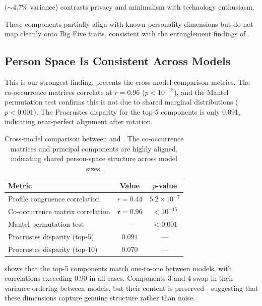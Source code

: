  ($\sim$4.7\% variance) contrasts privacy and minimalism with technology enthusiasm.

These components partially align with known personality dimensions but do not map cleanly onto Big Five traits, consistent with the entanglement findings of \citet{bhandari2026personality}.

\subsection{Person Space Is Consistent Across Models}
\label{sec:crossmodel_results}

This is our strongest finding.
 presents the cross-model comparison metrics.
The co-occurrence matrices correlate at $r = 0.96$ ($p < 10^{-15}$), and the Mantel permutation test confirms this is not due to shared marginal distributions ($p < 0.001$).
The Procrustes disparity for the top-5 components is only 0.091, indicating near-perfect alignment after rotation.

\begin{table}[t]
    \centering
    \caption{Cross-model comparison between \nano and \mini. The co-occurrence matrices and principal components are highly aligned, indicating shared person-space structure across model sizes.}
    \begin{tabular}{@{}lcc@{}}
        \toprule
        \textbf{Metric} & \textbf{Value} & \textbf{$p$-value} \\
        \midrule
        Profile congruence correlation & $r = 0.44$ & $5.2 \times 10^{-7}$ \\
        Co-occurrence matrix correlation & $\mathbf{r = 0.96}$ & $< 10^{-15}$ \\
        Mantel permutation test & --- & $< 0.001$ \\
        Procrustes disparity (top-5) & $\mathbf{0.091}$ & --- \\
        Procrustes disparity (top-10) & $\mathbf{0.070}$ & --- \\
        \bottomrule
    \end{tabular}
    \label{tab:crossmodel}
\end{table}

 shows that the top-5 components match one-to-one between models, with correlations exceeding 0.90 in all cases.
Components 3 and 4 swap in their variance ordering between models, but their content is preserved---suggesting that these dimensions capture genuine structure rather than noise.

